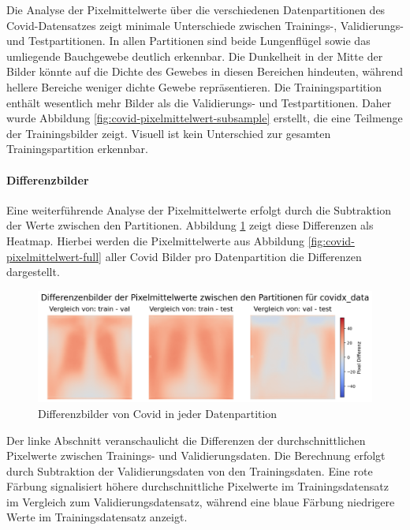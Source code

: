 Die Analyse der Pixelmittelwerte über die verschiedenen Datenpartitionen des Covid-Datensatzes zeigt minimale Unterschiede zwischen Trainings-, Validierungs- und Testpartitionen. In allen Partitionen sind beide Lungenflügel sowie das umliegende Bauchgewebe deutlich erkennbar. Die Dunkelheit in der Mitte der Bilder könnte auf die Dichte des Gewebes in diesen Bereichen hindeuten, während hellere Bereiche weniger dichte Gewebe repräsentieren. Die Trainingspartition enthält wesentlich mehr Bilder als die Validierungs- und Testpartitionen. Daher wurde Abbildung \ref{fig:covid-pixelmittelwert-subsample} erstellt, die eine Teilmenge der Trainingsbilder zeigt. Visuell ist kein Unterschied zur gesamten Trainingspartition erkennbar.


\paragraph{Differenzbilder} \label{chap:COVID19-differenzbilder}
Eine weiterführende Analyse der Pixelmittelwerte erfolgt durch die Subtraktion der Werte zwischen den Partitionen. Abbildung \ref{fig:differenz-datapartition-covid} zeigt diese Differenzen als Heatmap. Hierbei werden die Pixelmittelwerte aus Abbildung \ref{fig:covid-pixelmittelwert-full} aller Covid Bilder pro Datenpartition die Differenzen dargestellt.

\begin{figure}[H]
    \centering
    \includegraphics[width=\linewidth]{01-images/03-data/covidx-differenzenbilder.png}
    \caption{Differenzbilder von Covid in jeder Datenpartition}
    \label{fig:differenz-datapartition-covid}
\end{figure}

Der linke Abschnitt veranschaulicht die Differenzen der durchschnittlichen Pixelwerte zwischen Trainings- und Validierungsdaten. Die Berechnung erfolgt durch Subtraktion der Validierungsdaten von den Trainingsdaten. Eine rote Färbung signalisiert höhere durchschnittliche Pixelwerte im Trainingsdatensatz im Vergleich zum Validierungsdatensatz, während eine blaue Färbung niedrigere Werte im Trainingsdatensatz anzeigt.

